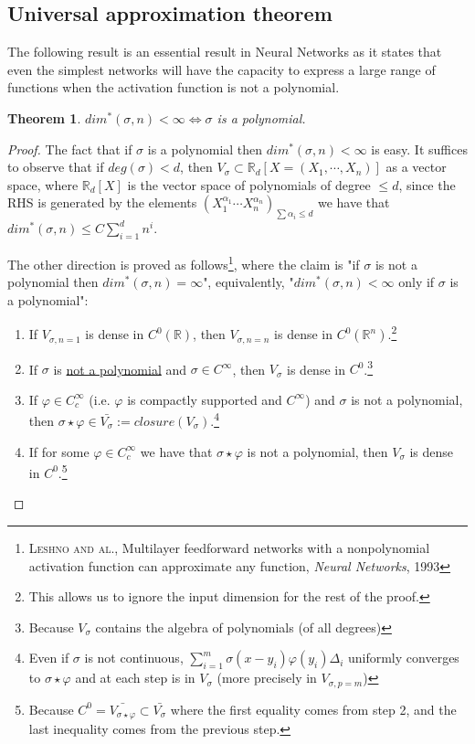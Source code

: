 \documentclass[11pt]{article} %
\newtheorem{theorem}{Theorem}[section]
\begin{document}
\subsection{Universal approximation theorem}
The following result is an essential result in Neural Networks as it states that even the simplest networks will have the capacity to express a large range of functions when the activation function is not a polynomial.
\begin{theorem}
	$dim^*(\sigma, n) < \infty \iff \sigma$ is a polynomial. 
\end{theorem}
\begin{proof}
The fact that if $\sigma$ is a polynomial then $dim^*(\sigma, n) < \infty$ is easy. It suffices to observe that if $deg(\sigma) < d$, then $V_\sigma \subset \mathbb{R}_d[X = (X_1, \cdots, X_n)]$ as a vector space, where $\mathbb{R}_d[X]$ is the vector space of polynomials of degree $\leq d$, since the RHS is generated by the elements $(X_1^{\alpha_1}\cdots X_n^{\alpha_n})_{\sum \alpha_i \leq d}$ we have that $dim^*(\sigma, n) \leq C \sum_{i=1}^d n^i$.
\par 
The other direction is proved as follows\footnote{\textsc{Leshno and al.}, Multilayer feedforward networks with a nonpolynomial activation function can approximate any function, \emph{Neural Networks}, 1993}, where the claim is "if $\sigma$ is not a polynomial then $dim^*(\sigma, n) = \infty$", equivalently, "$dim^*(\sigma,n)<\infty$ only if $\sigma$ is a polynomial":
\begin{enumerate}
	\item If $V_{\sigma,n=1}$ is dense in $C^0(\mathbb{R})$, then $V_{\sigma, n=n}$ is dense in $C^0(\mathbb{R}^n)$.\footnote{This allows us to ignore the input dimension for the rest of the proof.}
	\item If $\sigma$ is \underline{not a polynomial} and $\sigma \in C^\infty$, then $V_{\sigma}$ is dense in $C^0$.\footnote{Because $V_\sigma$ contains the algebra of polynomials (of all degrees)}
	\item If $\varphi \in C^\infty_c$ (i.e. $\varphi$ is compactly supported and $C^\infty$) and $\sigma$ is not a polynomial, then $\sigma \star \varphi \in \bar{V_{\sigma}} := closure(V_\sigma)$.\footnote{Even if $\sigma$ is not continuous, $\sum_{i=1}^m \sigma(x-y_i)\varphi(y_i)\Delta_i$ uniformly converges to $\sigma\star\varphi$ and at each step is in $V_\sigma$ (more precisely in $V_{\sigma, p=m}$)}
	\item If for some $\varphi \in C^\infty_c$ we have that $\sigma \star \varphi$ is not a polynomial, then $V_\sigma$ is dense in $C^0$.\footnote{Because $C^0 = \bar{V_{\sigma\star\varphi}} \subset \bar{V_{\sigma}}$ where the first equality comes from step 2, and the last inequality comes from the previous step.}

\end{enumerate}
\end{proof}
\end{document}
